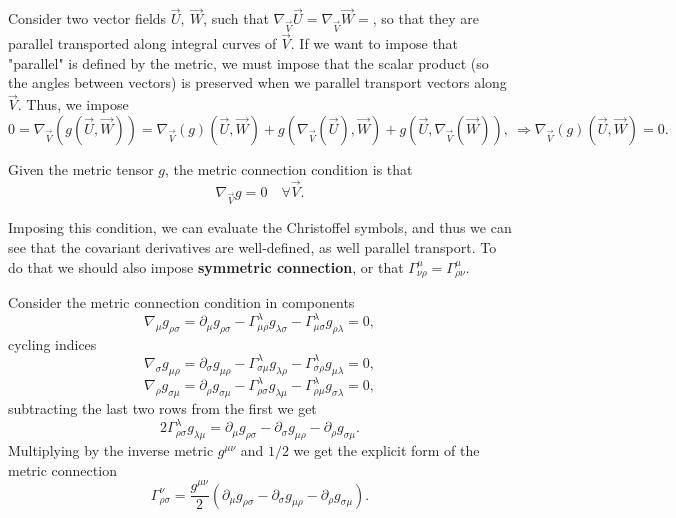 Consider two vector fields $\vec U,\ \vec W$, such that $\nabla_{\vec V}\vec U=\nabla_{\vec V}\vec W=$, so that they are parallel transported along integral curves of $\vec V$. If we want to impose that "parallel" is defined by the metric, we must impose that the scalar product (so the angles between vectors) is preserved when we parallel transport vectors along $\vec V$. Thus, we impose 
$$0=\nabla_{\vec{V}}(g(\vec U,\vec W))= \nabla_{\vec{V}}(g)(\vec U,\vec W)+g(\nabla_{\vec{V}}(\vec U),\vec W)+g(\vec U,\nabla_{\vec{V}}(\vec W)),\ \Rightarrow \boxed{\nabla_{\vec{V}}(g)(\vec U,\vec W)=0}.$$
\begin{defin}
    Given the metric tensor $g$, the metric connection condition is that $$ \boxed{\nabla_{\vec{V}}g=0}\quad\forall\vec V.$$
\end{defin}
Imposing this condition, we can evaluate the Christoffel symbols, and thus we can see that the covariant derivatives are well-defined, as well parallel transport. To do that we should also impose \textbf{symmetric connection}, or that $\Gamma^\mu_{\nu\rho}=\Gamma^\mu_{\rho\nu}$.

Consider the metric connection condition in components
$$\nabla_\mu g_{\rho\sigma}=\partial_\mu g_{\rho\sigma}-\Gamma^{\lambda}_{\mu\rho}g_{\lambda\sigma}-\Gamma^{\lambda}_{\mu\sigma}g_{\rho\lambda}=0,$$cycling indices$$\nabla_\sigma g_{\mu\rho}=\partial_\sigma g_{\mu\rho}-\Gamma^{\lambda}_{\sigma\mu}g_{\lambda\rho}-\Gamma^{\lambda}_{\sigma\rho}g_{\mu\lambda}=0,$$$$\nabla_\rho g_{\sigma\mu}=\partial_\rho g_{\sigma\mu}-\Gamma^{\lambda}_{\rho\sigma}g_{\lambda\mu}-\Gamma^{\lambda}_{\rho\mu}g_{\sigma\lambda}=0,$$ subtracting the last two rows from the first we get $$2\Gamma_{\rho\sigma}^\lambda g_{\lambda\mu}=\partial_\mu g_{\rho\sigma}-\partial_\sigma g_{\mu\rho}-\partial_\rho g_{\sigma\mu}.$$ Multiplying by the inverse metric $g^{\mu\nu}$ and $1/2$ we get the explicit form of the metric connection $$\boxed{\Gamma_{\rho\sigma}^\nu=\frac{g^{\mu\nu}}{2}(\partial_\mu g_{\rho\sigma}-\partial_\sigma g_{\mu\rho}-\partial_\rho g_{\sigma\mu})}.$$
